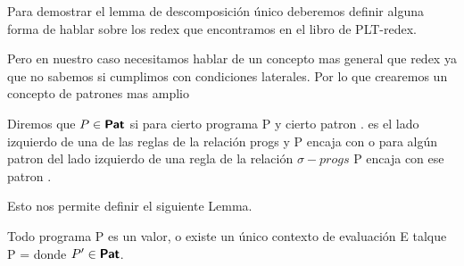 Para demostrar el lemma de descomposición único deberemos definir alguna forma de hablar sobre los redex que encontramos en el libro de PLT-redex.

Pero en nuestro caso necesitamos hablar de un concepto mas general que redex ya que no sabemos si cumplimos con condiciones laterales.
Por lo que crearemos un concepto de patrones mas amplio

\begin{definition}
    Diremos que $P \in \textsf{\textbf{Pat}}$ si para cierto programa P y cierto patron .  es el lado izquierdo de una de las reglas de la relación progs y P encaja con 
    o para algún patron  del lado izquierdo de una regla de la relación $\sigma-progs$ P encaja con ese patron .
\end{definition}

Esto nos permite definir el siguiente Lemma.

\begin{lemma}
    Todo programa P es un valor, o existe un único contexto de evaluación E talque 
    P =  donde $P' \in \textsf{\textbf{Pat}}$.
\end{lemma}

